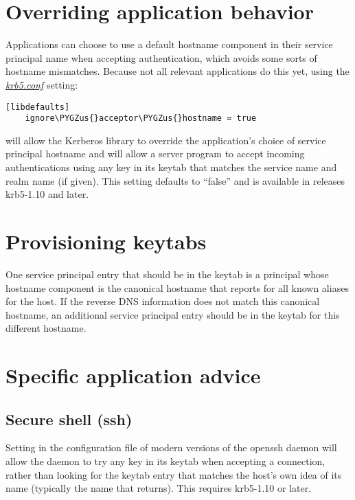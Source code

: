 \documentclass[letterpaper,10pt,english]{sphinxmanual}
\def\PYGZus{\char`\_}
\begin{document}
\section{Overriding application behavior}
\label{admin/princ_dns:overriding-application-behavior}
Applications can choose to use a default hostname component in their
service principal name when accepting authentication, which avoids
some sorts of hostname mismatches.  Because not all relevant
applications do this yet, using the {\hyperref[admin/conf_files/krb5_conf:krb5-conf-5]{\emph{krb5.conf}}} setting:

\begin{Verbatim}[commandchars=\\\{\}]
[libdefaults]
    ignore\PYGZus{}acceptor\PYGZus{}hostname = true
\end{Verbatim}

will allow the Kerberos library to override the application's choice
of service principal hostname and will allow a server program to
accept incoming authentications using any key in its keytab that
matches the service name and realm name (if given).  This setting
defaults to ``false'' and is available in releases krb5-1.10 and later.


\section{Provisioning keytabs}
\label{admin/princ_dns:provisioning-keytabs}
One service principal entry that should be in the keytab is a
principal whose hostname component is the canonical hostname that
 reports for all known aliases for the host.  If the
reverse DNS information does not match this canonical hostname, an
additional service principal entry should be in the keytab for this
different hostname.


\section{Specific application advice}
\label{admin/princ_dns:specific-application-advice}

\subsection{Secure shell (ssh)}
\label{admin/princ_dns:secure-shell-ssh}
Setting  in the configuration file
of modern versions of the openssh daemon will allow the daemon to try
any key in its keytab when accepting a connection, rather than looking
for the keytab entry that matches the host's own idea of its name
(typically the name that  returns).  This requires
krb5-1.10 or later.
\end{document}
